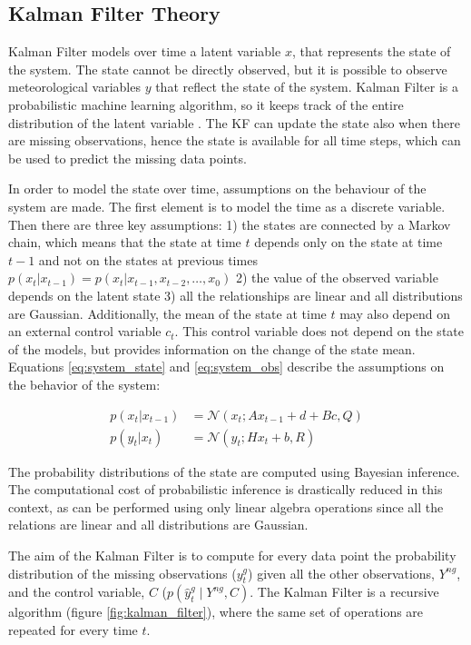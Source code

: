 \documentclass{article}
\newcommand{\norm}[3]{\mathcal{N}\left(#1; #2, #3\right)} %
\let\Oldsubsection\subsection
\renewcommand{\subsection}{\FloatBarrier\Oldsubsection}
\begin{document}
\subsection{Kalman Filter Theory}

Kalman Filter models over time a latent variable $x$, that represents the state of the system. The state cannot be directly observed, but it is possible to observe meteorological variables $y$ that reflect the state of the system. 
Kalman Filter is a probabilistic machine learning algorithm, so it keeps track of the entire distribution of the latent variable \cite{bishop_pattern_2006}.
The KF can update the state also when there are missing observations, hence the state is available for all time steps, which can be used to predict the missing data points.

In order to model the state over time, assumptions on the behaviour of the system are made. The first element is to model the time as a discrete variable.  Then there are three key assumptions: 1) the states are connected by a Markov chain, which means that the state at time $t$ depends only on the state at time $t-1$ and not on the states at previous times $p(x_t|x_{t-1}) = p(x_t|x_{t-1}, x_{t-2}, \hdots, x_0)$ 2) the value of the observed variable depends on the latent state 3) all the relationships are linear and all distributions are Gaussian. Additionally, the mean of the state at time $t$ may also depend on an external control variable $c_t$. This control variable does not depend on the state of the models, but provides information on the change of the state mean.
Equations \ref{eq:system_state} and \ref{eq:system_obs} describe the assumptions on the behavior of the system:

\begin{align}
p(x_t | x_{t-1}) &= \norm{x_t}{Ax_{t-1} + d + Bc}{Q} \label{eq:system_state}\\
p(y_t | x_t) &= \norm{y_t}{Hx_t + b}{R} \label{eq:system_obs}
\end{align}

The probability distributions of the state are computed using Bayesian inference. The computational cost of probabilistic inference is drastically reduced in this context, as can be performed using only linear algebra operations since all the relations are linear and all distributions are Gaussian.

The aim of the Kalman Filter is to compute for every data point the probability distribution of the missing observations ($y^g_t$) given all the other observations, $Y^{ng}$, and the control variable, $C$ ($p(\hat{y}^g_t \mid Y^{ng}, C)$. The Kalman Filter is a recursive algorithm (figure \ref{fig:kalman_filter}), where the same set of operations are repeated for every time $t$.
\end{document}

